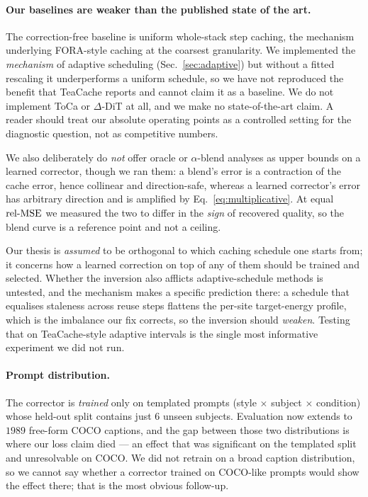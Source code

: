 \paragraph{Our baselines are weaker than the published state of the art.} The
correction-free baseline is uniform whole-stack step caching, the mechanism underlying
FORA-style caching \cite{selvaraju2024fora} at the coarsest granularity. We implemented
the \emph{mechanism} of adaptive scheduling (Sec.~\ref{sec:adaptive}) but without a
fitted rescaling it underperforms a uniform schedule, so we have not reproduced the
benefit that TeaCache \cite{liu2024teacache} reports and cannot claim it as a baseline.
We do not implement ToCa \cite{zou2024toca} or $\Delta$-DiT \cite{chen2024deltadit} at
all, and we make no state-of-the-art claim. A reader should treat our absolute operating
points as a controlled setting for the diagnostic question, not as competitive numbers.

We also deliberately do \emph{not} offer oracle or $\alpha$-blend analyses as upper
bounds on a learned corrector, though we ran them: a blend's error is a contraction of
the cache error, hence collinear and direction-safe, whereas a learned corrector's
error has arbitrary direction and is amplified by Eq.~\ref{eq:multiplicative}. At
equal $\mathrm{rel\text{-}MSE}$ we measured the two to differ in the \emph{sign} of recovered
quality, so the blend curve is a reference point and not a ceiling.

Our thesis is \emph{assumed} to be orthogonal to which caching schedule one starts
from; it concerns how a
learned correction on top of any of them should be trained and selected. Whether the
inversion also afflicts adaptive-schedule methods is untested, and the mechanism
makes a specific prediction there: a schedule that equalises staleness across reuse
steps flattens the per-site target-energy profile, which is the imbalance our fix
corrects, so the inversion should \emph{weaken}. Testing that on TeaCache-style
adaptive intervals is the single most informative experiment we did not run.

\paragraph{Prompt distribution.} The corrector is \emph{trained} only on templated
prompts (style $\times$ subject $\times$ condition) whose held-out split contains just
$6$ unseen subjects. Evaluation now extends to $1989$ free-form COCO captions, and the
gap between those two distributions is where our loss claim died --- an effect that was
significant on the templated split and unresolvable on COCO. We did not retrain on a
broad caption distribution, so we cannot say whether a corrector trained on COCO-like
prompts would show the effect there; that is the most obvious follow-up.

